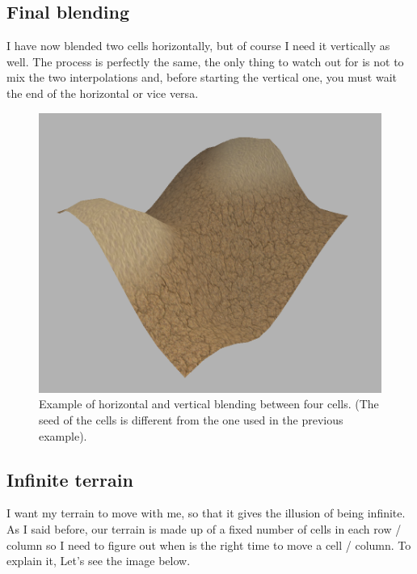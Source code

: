 \newpage

\subsection{Final blending}
I have now blended two cells horizontally, but of course I need it vertically as well. The process is perfectly the same, the only thing to watch out for is not to mix the two interpolations and, before starting the vertical one, you must wait the end of the horizontal or vice versa.

\newpage

\begin{figure}[hbt!]
	\centering
	\includegraphics[width= 0.9
	\textwidth]{images/terrain8.png}
	\caption{Example of horizontal and vertical blending between four cells. (The seed of the cells is different from the one used in the previous example).}
\end{figure} 


\subsection{Infinite terrain}
\label{sub::infinteTerrain}
I want my terrain to move with me, so that it gives the illusion of being infinite. As I said before, our terrain is made up of a fixed number of cells in each row / column so I need to figure out when is the right time to move a cell / column. To explain it, Let's see the image below.

